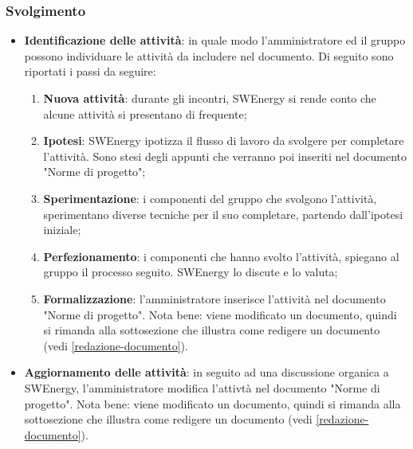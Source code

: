 \subsubsection{Svolgimento}
\begin{itemize}
	\item \textbf{Identificazione delle attività}: in quale modo
	      l'amministratore ed il gruppo possono individuare le attività da
	      includere nel documento. Di seguito sono riportati i passi da
	      seguire:
	      \begin{enumerate}
		      \item \textbf{Nuova attività}: durante gli incontri,
		            SWEnergy si rende conto che alcune attività si
		            presentano di frequente;

		      \item \textbf{Ipotesi}: SWEnergy ipotizza il flusso di lavoro da
		            svolgere per completare l'attività. Sono stesi degli appunti
		            che verranno poi inseriti nel documento "Norme di progetto";

		      \item \textbf{Sperimentazione}: i componenti del gruppo che
		            svolgono l'attività, sperimentano diverse tecniche per
		            il suo completare, partendo dall'ipotesi iniziale;

		      \item \textbf{Perfezionamento}: i componenti che hanno
		            svolto l'attività, spiegano al gruppo il processo
		            seguito. SWEnergy lo discute e lo valuta;

		      \item \textbf{Formalizzazione}: l'amministratore inserisce
		            l'attività nel documento "Norme di progetto". Nota bene:
		            viene modificato un documento, quindi si rimanda alla
		            sottosezione che illustra come redigere un documento
		            (vedi \cref{redazione-documento}).
	      \end{enumerate}

	\item \textbf{Aggiornamento delle attività}: in seguito ad una discussione
	      organica a SWEnergy, l'amministratore modifica l'attivtà
	      nel documento "Norme di progetto". Nota bene:
	      viene modificato un documento, quindi si rimanda alla
	      sottosezione che illustra come redigere un documento
	      (vedi \cref{redazione-documento}).
\end{itemize}

